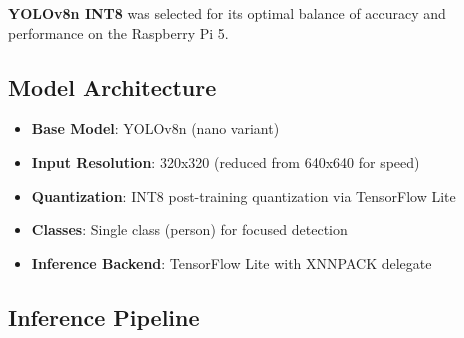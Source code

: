 \documentclass[11pt,letterpaper]{article}
\begin{document}
\textbf{YOLOv8n INT8} was selected for its optimal balance of accuracy and performance on the Raspberry Pi 5.

\subsection{Model Architecture}

\begin{itemize}
    \item \textbf{Base Model}: YOLOv8n (nano variant)
    \item \textbf{Input Resolution}: 320x320 (reduced from 640x640 for speed)
    \item \textbf{Quantization}: INT8 post-training quantization via TensorFlow Lite
    \item \textbf{Classes}: Single class (person) for focused detection
    \item \textbf{Inference Backend}: TensorFlow Lite with XNNPACK delegate
\end{itemize}

\subsection{Inference Pipeline}
\end{document}
